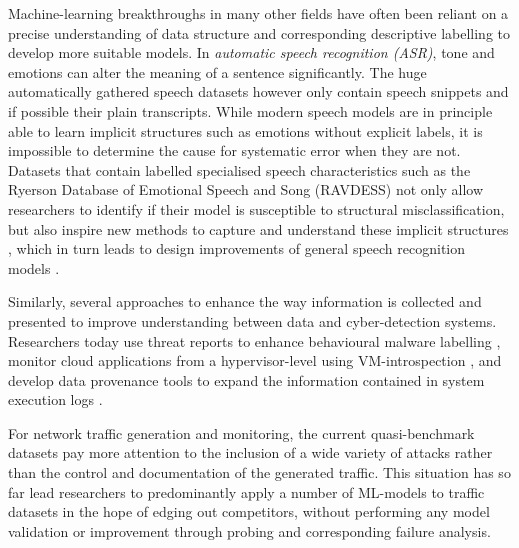 \documentclass[runningheads]{llncs}
\begin{document}
Machine-learning breakthroughs in many other fields have often been reliant on a precise understanding of data structure and corresponding descriptive labelling to develop more suitable models.
In \textit{automatic speech recognition (ASR)}, tone and emotions can alter the meaning of a sentence significantly. The huge automatically gathered speech datasets however only contain speech snippets and if possible their plain transcripts. While modern speech models are in principle able to learn implicit structures such as emotions without explicit labels, it is impossible to determine the cause for systematic error when they are not. Datasets that contain labelled specialised speech characteristics such as the Ryerson Database of Emotional Speech and Song (RAVDESS) \cite{livingstone2018ryerson} not only allow researchers to identify if their model is susceptible to structural misclassification, but also inspire new methods to capture and understand these implicit structures \cite{haque2019audio}, which in turn leads to design improvements of general speech recognition models \cite{kamper2020multilingual}.


Similarly, several approaches to enhance the way information is collected and presented to improve understanding between data and cyber-detection systems. Researchers today use threat reports to enhance behavioural malware labelling \cite{smith2020mind}, monitor cloud applications from a hypervisor-level using VM-introspection \cite{dolan2011virtuoso}, and develop data provenance tools to expand the information contained in system execution logs \cite{barre2019mining}. 

For network traffic generation and monitoring, the current quasi-benchmark datasets pay more attention to the inclusion of a wide variety of attacks rather than the control and documentation of the generated traffic. This situation has so far lead researchers to predominantly apply a number of ML-models to traffic datasets in the hope of edging out competitors, without performing any model validation or improvement through probing and corresponding failure analysis.

\end{document}
